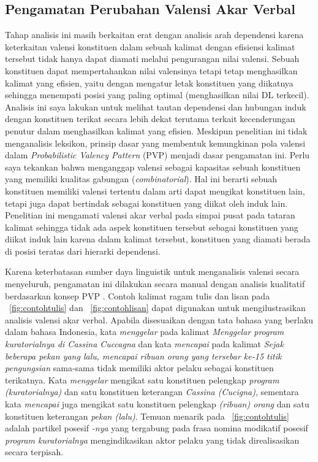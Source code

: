 \subsection{Pengamatan Perubahan Valensi Akar Verbal}
Tahap analisis ini masih berkaitan erat dengan analisis arah dependensi karena keterkaitan valensi konstituen dalam sebuah kalimat dengan efisiensi kalimat tersebut tidak hanya dapat diamati melalui pengurangan nilai valensi. Sebuah konstituen dapat mempertahankan nilai valensinya tetapi tetap menghasilkan kalimat yang efisien, yaitu dengan mengatur letak konstituen yang diikatnya sehingga menempati posisi yang paling optimal (menghasilkan nilai DL terkecil). Analisis ini saya lakukan untuk melihat tautan dependensi dan hubungan induk dengan konstituen terikat secara lebih dekat terutama terkait kecenderungan penutur dalam menghasilkan kalimat yang efisien. Meskipun penelitian ini tidak menganalisis leksikon, prinsip dasar yang membentuk kemungkinan pola valensi dalam \textit{Probabilistic Valency Pattern} (PVP) \citep{liu2006syntactic} menjadi dasar pengamatan ini. Perlu saya tekankan bahwa \cite{liu2006syntactic} menganggap valensi sebagai kapasitas sebuah konstituen yang memiliki kualitas gabungan (\textit{combinatorial}). Hal ini berarti sebuah konstituen memiliki valensi tertentu dalam arti dapat mengikat konstituen lain, tetapi juga dapat bertindak sebagai konstituen yang diikat oleh induk lain. Penelitian ini mengamati valensi akar verbal pada simpai pusat pada tataran kalimat sehingga tidak ada aspek konstituen tersebut sebagai konstituen yang diikat induk lain karena dalam kalimat tersebut, konstituen yang diamati berada di posisi teratas dari hierarki dependensi.

Karena keterbatasan sumber daya linguistik untuk menganalisis valensi secara menyeluruh, pengamatan ini dilakukan secara manual dengan analisis kualitatif berdasarkan konsep PVP \citep{liu2006syntactic}. Contoh kalimat ragam tulis dan lisan pada \pic~\ref{fig:contohtulis} dan \pic~\ref{fig:contohlisan} dapat digunakan untuk mengilustrasikan analisis valensi akar verbal. Apabila disesuaikan dengan tata bahasa yang berlaku dalam bahasa Indonesia, kata \textit{menggelar} pada kalimat \textit{Menggelar program kuratorialnya di Cassina Cuccagna} dan kata \textit{mencapai} pada kalimat \textit{Sejak beberapa pekan yang lalu, mencapai ribuan orang yang tersebar ke-15 titik pengungsian} sama-sama tidak memiliki aktor pelaku sebagai konstituen terikatnya. Kata \textit{menggelar} mengikat satu konstituen pelengkap \textit{program (kuratorialnya)} dan satu konstituen keterangan \textit{Cassina (Cucigna)}, sementara kata \textit{mencapai} juga mengikat satu konstituen pelengkap \textit{(ribuan) orang} dan satu konstituen keterangan \textit{pekan (lalu)}. Temuan menarik pada \pic~\ref{fig:contohtulis} adalah partikel posesif \textit{-nya} yang tergabung pada frasa nomina modikatif posesif \textit{program kuratorialnya} mengindikasikan aktor pelaku yang tidak direalisasikan secara terpisah. 
